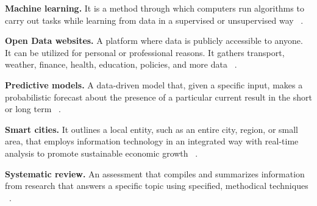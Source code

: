 \documentclass[a4paper,12pt,twoside]{ThesisStyle}
\begin{document}
\textbf{Machine learning.} It is a method through which computers run algorithms to carry out tasks while learning from data in a supervised or unsupervised way ~\cite{wazid2022uniting}.

\textbf{Open Data websites.} A platform where data is publicly accessible to anyone. It can be utilized for personal or professional reasons. It gathers transport, weather, finance, health, education, policies, and more data ~\cite{talukder2019determinants}.

\textbf{Predictive models.} A data-driven model that, given a specific input, makes a probabilistic forecast about the presence of a particular current result in the short or long term ~\cite{de2022guidelines}. 

\textbf{Smart cities.} It outlines a local entity, such as an entire city, region, or small area, that employs information technology in an integrated way with real-time analysis to promote sustainable economic growth ~\cite{Kulkarni2016}.

\textbf{Systematic review.} An assessment that compiles and summarizes information from research that answers a specific topic using specified, methodical techniques ~\cite{PRISMA2020}. 
\end{document}
